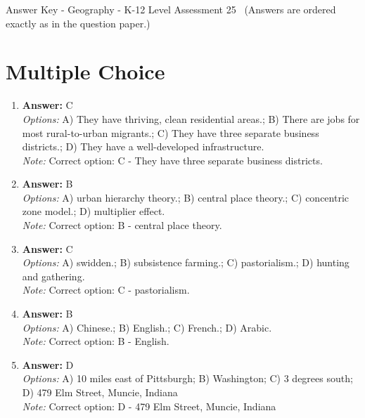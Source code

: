 \documentclass[12pt]{article}
\begin{document}
\begin{center}
Answer Key - Geography - K-12 Level Assessment 25 \
\small (Answers are ordered exactly as in the question paper.)
\end{center}

\section*{Multiple Choice}
\begin{enumerate}[label=\arabic*.]
\item \textbf{Answer:} C
\\ \textit{Options:} A) They have thriving, clean residential areas.; B) There are jobs for most rural-to-urban migrants.; C) They have three separate business districts.; D) They have a well-developed infrastructure.
\\ \textit{Note:} Correct option: C - They have three separate business districts.
\item \textbf{Answer:} B
\\ \textit{Options:} A) urban hierarchy theory.; B) central place theory.; C) concentric zone model.; D) multiplier effect.
\\ \textit{Note:} Correct option: B - central place theory.
\item \textbf{Answer:} C
\\ \textit{Options:} A) swidden.; B) subsistence farming.; C) pastorialism.; D) hunting and gathering.
\\ \textit{Note:} Correct option: C - pastorialism.
\item \textbf{Answer:} B
\\ \textit{Options:} A) Chinese.; B) English.; C) French.; D) Arabic.
\\ \textit{Note:} Correct option: B - English.
\item \textbf{Answer:} D
\\ \textit{Options:} A) 10 miles east of Pittsburgh; B) Washington; C) 3 degrees south; D) 479 Elm Street, Muncie, Indiana
\\ \textit{Note:} Correct option: D - 479 Elm Street, Muncie, Indiana
\end{enumerate}
\end{document}
